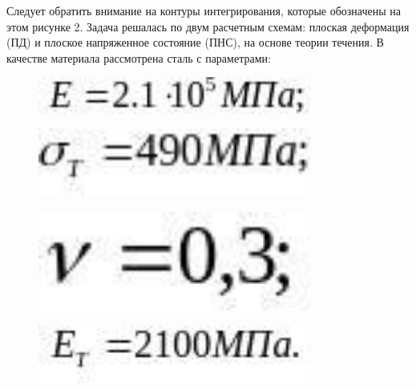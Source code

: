 Следует обратить внимание на контуры интегрирования, которые обозначены
на этом рисунке 2. Задача решалась по двум расчетным схемам: плоская
деформация (ПД) и плоское напряженное состояние (ПНС), на основе теории
течения. В качестве материала рассмотрена сталь с параметрами:
\begin{figure}[H]
	\centering
	\includegraphics[width=0.8\textwidth]{assets/1135}
	\caption*{}
\end{figure} \begin{figure}[H]
	\centering
	\includegraphics[width=0.8\textwidth]{assets/1136}
	\caption*{}
\end{figure}
\begin{figure}[H]
	\centering
	\includegraphics[width=0.8\textwidth]{assets/1137}
	\caption*{}
\end{figure} \begin{figure}[H]
	\centering
	\includegraphics[width=0.8\textwidth]{assets/1138}
	\caption*{}
\end{figure}


